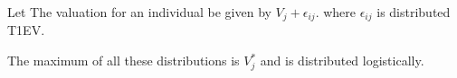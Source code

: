 Let The valuation for an individual be given by $V_{j} + \epsilon_{ij}$.
where $\epsilon_{ij}$ is distributed T1EV.

The maximum of all these distributions is $V_j^{*}$ and is distributed
logistically. 